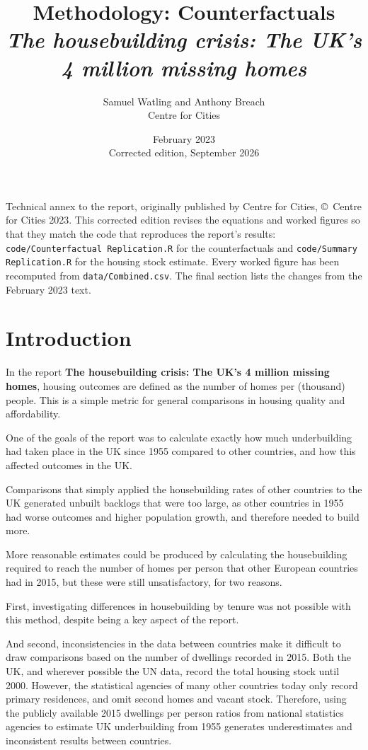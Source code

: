 \documentclass[11pt,a4paper]{article}
\title{Methodology: Counterfactuals\\[0.5em]
  \large\emph{The housebuilding crisis: The UK's 4 million missing homes}}
\author{Samuel Watling and Anthony Breach\\[0.3em]\normalsize Centre for Cities}
\date{February 2023\\[0.2em]\small Corrected edition, September 2026}
\newcommand{\code}[1]{\texttt{#1}}
\begin{document}
\maketitle

\begin{center}
\begin{minipage}{0.9\textwidth}\small
Technical annex to the report, originally published by Centre for Cities,
\copyright\ Centre for Cities 2023. This corrected edition revises the equations and
worked figures so that they match the code that reproduces the report's results:
\code{code/Counterfactual Replication.R} for the counterfactuals and
\code{code/Summary Replication.R} for the housing stock estimate. Every worked figure
has been recomputed from \code{data/Combined.csv}. The final section lists the changes
from the February 2023 text.
\end{minipage}
\end{center}

\section*{Introduction}

In the report \textbf{The housebuilding crisis: The UK's 4 million missing homes},
housing outcomes are defined as the number of homes per (thousand) people. This is a
simple metric for general comparisons in housing quality and affordability.

One of the goals of the report was to calculate exactly how much underbuilding had
taken place in the UK since 1955 compared to other countries, and how this affected
outcomes in the UK.

Comparisons that simply applied the housebuilding rates of other countries to the UK
generated unbuilt backlogs that were too large, as other countries in 1955 had worse
outcomes and higher population growth, and therefore needed to build more.

More reasonable estimates could be produced by calculating the housebuilding required
to reach the number of homes per person that other European countries had in 2015, but
these were still unsatisfactory, for two reasons.

First, investigating differences in housebuilding by tenure was not possible with this
method, despite being a key aspect of the report.

And second, inconsistencies in the data between countries make it difficult to draw
comparisons based on the number of dwellings recorded in 2015. Both the UK, and wherever
possible the UN data, record the total housing stock until 2000. However, the
statistical agencies of many other countries today only record primary residences, and
omit second homes and vacant stock. Therefore, using the publicly available 2015
dwellings per person ratios from national statistics agencies to estimate UK
underbuilding from 1955 generates underestimates and inconsistent results between
countries.
\end{document}
